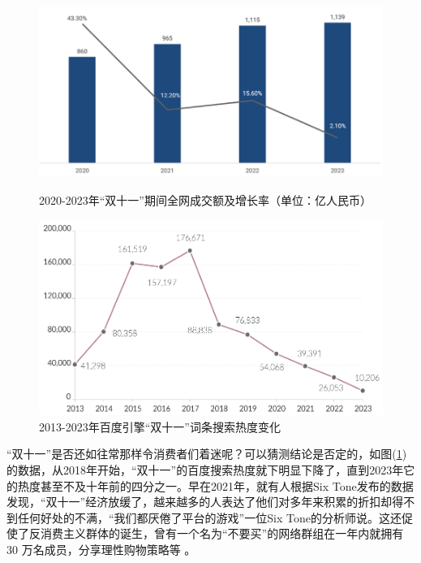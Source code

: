 \documentclass[12pt]{ctexart}
\begin{document}
\begin{figure}[htbp!]
    \begin{minipage}[t]{0.5\textwidth}
        \centering
        \includegraphics[width=\textwidth]{Images/14.png}
        \caption{2020-2023年“双十一”期间全网成交额及增长率（单位：亿人民币）\cite{16}}
        \label{double}
    \end{minipage}
    \hfill
    \begin{minipage}[t]{0.45\textwidth}
        \centering
        \includegraphics[width=\textwidth]{Images/15.png}
        \caption{2013-2023年百度引擎“双十一”词条搜索热度变化 \cite{17}}
        \label{cite}
    \end{minipage}
\end{figure}

“双十一”是否还如往常那样令消费者们着迷呢？可以猜测结论是否定的，如图(\ref{cite})的数据，从2018年开始，“双十一”的百度搜索热度就下明显下降了，直到2023年它的热度甚至不及十年前的四分之一。早在2021年，就有人根据Six Tone发布的数据发现，“双十一”经济放缓了，越来越多的人表达了他们对多年来积累的折扣却得不到任何好处的不满，“我们都厌倦了平台的游戏”一位Six Tone的分析师说。这还促使了反消费主义群体的诞生，曾有一个名为“不要买”的网络群组在一年内就拥有 30 万名成员，分享理性购物策略等 \cite{18}。
\end{document}
